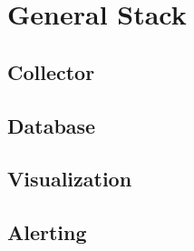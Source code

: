 
\chapter{General Stack}
\label{chap:ch2}
\section{Collector}

\section{Database}

\section{Visualization}

\section{Alerting}



\blinddocument
